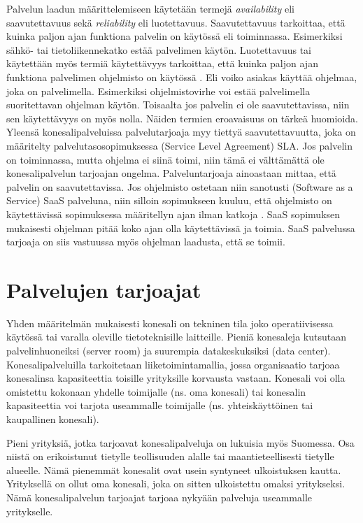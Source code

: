 Palvelun laadun määrittelemiseen käytetään termejä \emph{availability} eli saavutettavuus sekä \emph{reliability} eli luotettavuus. Saavutettavuus tarkoittaa, että kuinka paljon ajan funktiona palvelin on käytössä eli toiminnassa. Esimerkiksi sähkö- tai tietoliikennekatko estää palvelimen käytön. Luotettavuus tai käytettään myös termiä käytettävyys tarkoittaa, että kuinka paljon ajan funktiona palvelimen ohjelmisto on käytössä \citep{service_availability} \citep{itil}. Eli voiko asiakas käyttää ohjelmaa, joka on palvelimella. Esimerkiksi ohjelmistovirhe voi estää palvelimella suoritettavan ohjelman käytön. Toisaalta jos palvelin ei ole saavutettavissa, niin sen käytettävyys on myös nolla. Näiden termien eroavaisuus on tärkeä huomioida. Yleensä konesalipalveluissa palvelutarjoaja myy tiettyä saavutettavuutta, joka on määritelty palvelutasosopimuksessa (Service Level Agreement) SLA. Jos palvelin on toiminnassa, mutta ohjelma ei siinä toimi, niin tämä ei välttämättä ole konesalipalvelun tarjoajan ongelma. Palveluntarjoaja ainoastaan mittaa, että palvelin on saavutettavissa. Jos ohjelmisto ostetaan niin sanotusti (Software as a Service) SaaS palveluna, niin silloin sopimukseen kuuluu, että ohjelmisto on käytettävissä sopimuksessa määritellyn ajan ilman katkoja \citep{software_service}. SaaS sopimuksen mukaisesti ohjelman pitää koko ajan olla käytettävissä ja toimia. SaaS palvelussa tarjoaja on siis vastuussa myös ohjelman laadusta, että se toimii.

\section{Palvelujen tarjoajat}
Yhden määritelmän mukaisesti konesali on tekninen tila joko operatiivisessa käytössä tai varalla oleville tietoteknisille laitteille. Pieniä konesaleja kutsutaan palvelinhuoneiksi (server room) ja suurempia datakeskuksiksi (data center). Konesalipalveluilla tarkoitetaan liiketoimintamallia, jossa organisaatio tarjoaa konesalinsa kapasiteettia toisille yrityksille korvausta vastaan. Konesali voi olla omistettu kokonaan yhdelle toimijalle (ns. oma konesali) tai konesalin kapasiteettia voi tarjota useammalle toimijalle (ns. yhteiskäyttöinen tai kaupallinen konesali).\citep{itewiki}

Pieni yrityksiä, jotka tarjoavat konesalipalveluja on lukuisia myös Suomessa. Osa niistä on erikoistunut tietylle teollisuuden alalle tai maantieteellisesti tietylle alueelle. Nämä pienemmät konesalit ovat usein syntyneet ulkoistuksen kautta. Yrityksellä on ollut oma konesali, joka on sitten ulkoistettu omaksi yritykseksi. Nämä konesalipalvelun tarjoajat tarjoaa nykyään palveluja useammalle yritykselle.\citep{tnnet} 

